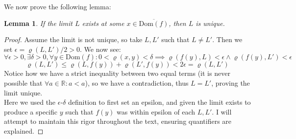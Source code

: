 \documentclass[10pt,letterpaper]{article} %
\newtheorem{lem}{Lemma}[section]
\begin{document}
We now prove the following lemma:
\begin{lem}
If the limit $L$ exists at some $x \in \overline{\text{Dom}(f)}$, then $L$ is unique.
\end{lem}
\begin{proof}
Assume the limit is not unique, so take $L, L'$ such that $L \neq L'$. Then we set $\epsilon = \varrho(L, L')/2 > 0$. We now see:
\begin{equation*}
\forall \epsilon > 0, \exists \delta > 0, \forall y \in \text{Dom}(f): 0 < \varrho(x, y) < \delta \implies \varrho(f(y), L) < \epsilon \land \varrho(f(y), L') < \epsilon
\end{equation*}
\begin{equation*}
\varrho(L, L') \leqslant \varrho(L, f(y)) + \varrho(L', f(y)) < 2\epsilon = \varrho(L, L')
\end{equation*}
Notice how we have a strict inequality between two equal terms (it is never possible that $\forall a \in \mathbb{R}: a < a$), so we have a contradiction, thus $L = L'$, proving the limit unique.\\

Here we used the $\epsilon$-$\delta$ definition to first set an epsilon, and given the limit exists to produce a specific $y$ such that $f(y)$ was within epsilon of each $L, L'$. I will attempt to maintain this rigor throughout the text, ensuring quantifiers are explained.
\end{proof}
\end{document}
